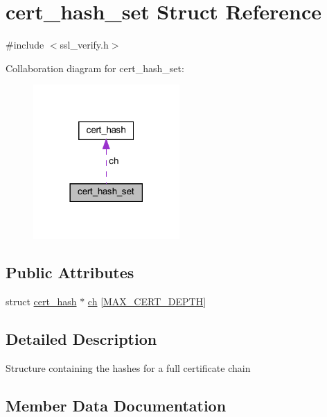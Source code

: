 \hypertarget{structcert__hash__set}{}\section{cert\+\_\+hash\+\_\+set Struct Reference}
\label{structcert__hash__set}


{\ttfamily \#include $<$ssl\+\_\+verify.\+h$>$}



Collaboration diagram for cert\+\_\+hash\+\_\+set\+:
\nopagebreak
\begin{figure}[H]
\begin{center}
\leavevmode
\includegraphics[width=158pt]{structcert__hash__set__coll__graph}
\end{center}
\end{figure}
\subsection*{Public Attributes}
\begin{DoxyCompactItemize}
\item 
struct \hyperlink{structcert__hash}{cert\+\_\+hash} $\ast$ \hyperlink{structcert__hash__set_a1d62c176153ce49841aea5c0aed607a2}{ch} \mbox{[}\hyperlink{ssl__verify_8h_ab7f713661d9681e187960a247105692d}{M\+A\+X\+\_\+\+C\+E\+R\+T\+\_\+\+D\+E\+P\+T\+H}\mbox{]}
\end{DoxyCompactItemize}


\subsection{Detailed Description}
Structure containing the hashes for a full certificate chain 

\subsection{Member Data Documentation}
\hypertarget{structcert__hash__set_a1d62c176153ce49841aea5c0aed607a2}{}
